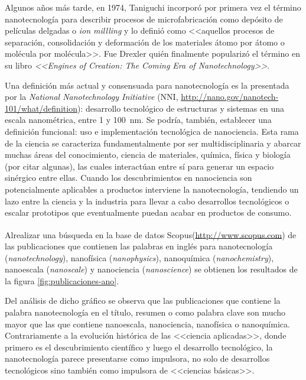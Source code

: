	 Algunos años más tarde, en 1974, Taniguchi incorporó por primera vez el término nanotecnología para describir procesos de microfabricación como depósito de películas delgadas o \textit{ion millling} y lo definió como <<aquellos procesos de separación, consolidación y deformación de los materiales átomo por átomo o molécula por molécula>>. \cite{taniguchi1974} Fue Drexler quién finalmente popularizó el término en su libro \textit{<<Engines of Creation: The Coming Era of Nanotechnology>>}\cite{drexler1987}. 

	 Una definición más actual y consensuada para nanotecnología es la presentada por la \textit{National Nanotechnology Initiative} (NNI, \url{http://nano.gov/nanotech-101/what/definition}): desarrollo tecnológico de estructuras y sistemas en una escala nanométrica, entre 1 y \SI{100}{\nm}. Se podría, también, establecer una definición funcional: uso e implementación tecnológica de nanociencia. Esta rama de la ciencia se caracteriza fundamentalmente por ser multidisciplinaria y abarcar muchas áreas del conocimiento, ciencia de materiales, química, física y biología (por citar algunas), las cuales interactúan entre sí para generar un espacio sinérgico entre ellas. Cuando los descubrimientos en nanociencia son potencialmente aplicables a productos interviene la nanotecnología, tendiendo un lazo entre la ciencia y la industria para llevar a cabo desarrollos tecnológicos o escalar prototipos que eventualmente puedan acabar en productos de consumo.
	
	 Al\space realizar una búsqueda en la base de datos Scopus\textsuperscript\textregistered (\url{http://www.scopus.com}) de las publicaciones que contienen las palabras en inglés para nanotecnología (\textit{nanotechnology}), nanofísica (\textit{nanophysics}), nanoquímica (\textit{nanochemistry}), nanoescala (\textit{nanoscale}) y nanociencia (\textit{nanoscience}) se obtienen los resultados de la figura \ref{fig:publicaciones-ano}. 

	 Del análisis de dicho gráfico se observa que las publicaciones que contiene la palabra nanotecnología en el título, resumen o como palabra clave son mucho mayor que las que contiene nanoescala, nanociencia, nanofísica o nanoquímica. Contrariamente a la evolución histórica de las <<ciencia aplicadas>>, donde primero es el descubrimiento científico y luego el desarrollo tecnológico, la nanotecnología parece presentarse como impulsora, no solo de desarrollos tecnológicos sino también como impulsora de <<ciencias básicas>>.

